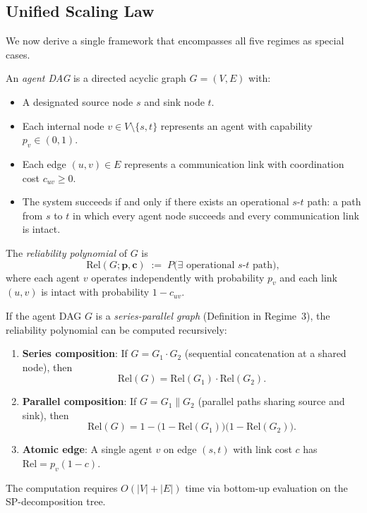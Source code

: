 \subsection{Unified Scaling Law}
\label{subsec:unified}

We now derive a single framework that encompasses all five regimes as special cases.

\begin{definition}
\label{def:agent-dag}
An \emph{agent DAG} is a directed acyclic graph $G = (V, E)$ with:
\begin{itemize}
  \item A designated source node $s$ and sink node $t$.
  \item Each internal node $v \in V \setminus \{s,t\}$ represents an agent with
    capability $p_v \in (0,1)$.
  \item Each edge $(u,v) \in E$ represents a communication link with coordination
    cost $c_{uv} \geq 0$.
  \item The system succeeds if and only if there exists an operational $s$-$t$ path:
    a path from $s$ to $t$ in which every agent node succeeds and every communication
    link is intact.
\end{itemize}
The \emph{reliability polynomial} of $G$ is
\[
  \mathrm{Rel}(G; \mathbf{p}, \mathbf{c}) \;:=\;
    P\bigl(\exists \text{ operational } s\text{-}t \text{ path}\bigr),
\]
where each agent $v$ operates independently with probability $p_v$ and each link
$(u,v)$ is intact with probability $1 - c_{uv}$.
\end{definition}

\begin{theorem}
\label{thm:sp-reduction}
If the agent DAG $G$ is a \emph{series-parallel graph} (Definition in Regime~3),
the reliability polynomial can be computed recursively:
\begin{enumerate}
  \item \textbf{Series composition}: If $G = G_1 \cdot G_2$ (sequential
    concatenation at a shared node), then
    \[
      \mathrm{Rel}(G) = \mathrm{Rel}(G_1) \cdot \mathrm{Rel}(G_2).
    \]

  \item \textbf{Parallel composition}: If $G = G_1 \| G_2$ (parallel paths sharing
    source and sink), then
    \[
      \mathrm{Rel}(G) = 1 - \bigl(1 - \mathrm{Rel}(G_1)\bigr)
        \bigl(1 - \mathrm{Rel}(G_2)\bigr).
    \]

  \item \textbf{Atomic edge}: A single agent $v$ on edge $(s,t)$ with link cost $c$
    has $\mathrm{Rel} = p_v(1-c)$.
\end{enumerate}
The computation requires $O(|V| + |E|)$ time via bottom-up evaluation on the
SP-decomposition tree.
\end{theorem}

